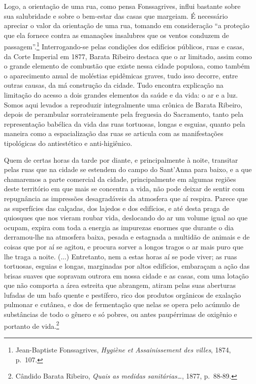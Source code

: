 Logo, a orientação de uma rua, como pensa Fonssagrives, influi bastante
sobre sua salubridade e sobre o bem-estar das casas que margeiam. É
necessário apreciar o valor da orientação de uma rua, tomando em
consideração ``a proteção que ela fornece contra as emanações insalubres
que os ventos conduzem de passagem''.\footnote{Jean-Baptiste
  Fonssagrives, \emph{Hygiène et Assainissement des villes}, 1874,
  p.~107.} Interrogando-se pelas condições dos edifícios públicos, ruas
e casas, da Corte Imperial em 1877, Barata Ribeiro destaca que o ar
limitado, assim como o grande elemento de combustão que existe nessa
cidade populosa, como também o aparecimento anual de moléstias
epidêmicas graves, tudo isso decorre, entre outras causas, da má
construção da cidade. Tudo encontra explicação na limitação do acesso a
dois grandes elementos da saúde e da vida: o ar e a luz. Somos aqui
levados a reproduzir integralmente uma crônica de Barata Ribeiro, depois
de perambular sorrateiramente pela freguesia do Sacramento, tanto pela
representação babélica da vida das ruas tortuosas, longas e esguias,
quanto pela maneira como a espacialização das ruas se articula com as
manifestações tipológicas do antiestético e anti-higiênico.

Quem de certas horas da tarde por diante, e principalmente à noite,
transitar pelas ruas que na cidade se estendem do campo do Sant'Anna
para baixo, e a que chamaremos a parte comercial da cidade,
principalmente em algumas regiões deste território em que mais se
concentra a vida, não pode deixar de sentir com repugnância as
impressões desagradáveis da atmosfera que aí respira. Parece que as
superfícies das calçadas, dos lajedos e dos edifícios, e até desta praga
de quiosques que nos vieram roubar vida, deslocando do ar um volume
igual ao que ocupam, expira com toda a energia as impurezas enormes que
durante o dia derramou-lhe na atmosfera baixa, pesada e estagnada a
multidão de animais e de coisas que por aí se agitou, e procura sorver a
longos tragos o ar mais puro que lhe traga a noite. (...) Entretanto,
nem a estas horas aí se pode viver; as ruas tortuosas, esguias e longas,
marginadas por altos edifícios, embaraçam a ação das brisas suaves que
sopravam outrora em nossa cidade e as casas, com uma lotação que não
comporta a área estreita que abrangem, atiram pelas suas aberturas
lufadas de um bafo quente e pestífero, rico dos produtos orgânicos de
exalação pulmonar e cutânea, e dos de fermentação que nelas se opera
pelo acúmulo de substâncias de todo o gênero e só pobres, ou antes
paupérrimas de oxigênio e portanto de vida.\footnote{Cândido Barata
  Ribeiro, \emph{Quais as medidas sanitárias\ldots{}}, 1877, p.~88-89.}

